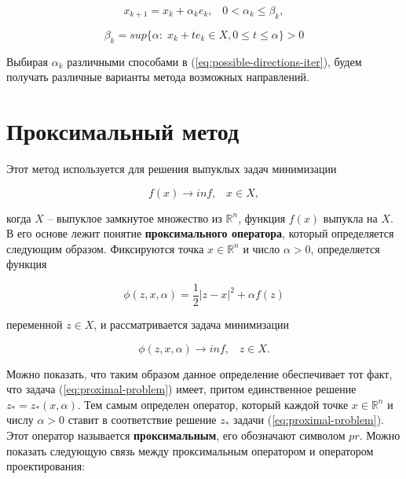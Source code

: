 \documentclass[a4paper, 12pt, titlepage]{article}
\theoremstyle{definition}
\theoremstyle{plain}
\theoremstyle{plain}
\begin{document}
\begin{equation}
 \label{eq:possible-directions-iter}
 x_{k + 1} = x_{k} + \alpha_{k} e_{k}, \;\;\; 0 < \alpha_{k} \leq \beta_{k},
\end{equation}

\begin{equation}
 \beta_{k} = sup \{\alpha: \; x_{k} + t e _{k} \in X, 0 \leq t \leq \alpha\} > 0
\end{equation}

Выбирая $\alpha_{k}$ различными способами в (\ref{eq:possible-directions-iter}),
будем получать различные варианты метода возможных направлений.

\section{Проксимальный метод}

Этот метод используется для решения выпуклых задач минимизации

\begin{equation}
 f(x) \to inf, \;\;\; x \in X,
\end{equation}

когда $X$ -- выпуклое замкнутое множество из $\mathbb{R}^{n}$, функция $f(x)$
выпукла на $X$. В его основе лежит понятие \textbf{проксимального оператора},
который определяется следующим образом. Фиксируются точка $x \in \mathbb{R}^{n}$
и число $\alpha > 0$, определяется функция

\begin{equation}
 \phi(z, x, \alpha) = \frac{1}{2} |z - x|^{2} + \alpha f(z)
\end{equation}

переменной $z \in X$, и рассматривается задача минимизации

\begin{equation}
 \label{eq:proximal-problem}
 \phi(z, x, \alpha) \to inf, \;\;\; z \in X.
\end{equation}

Можно показать, что таким образом данное определение обеспечивает тот факт,
что задача (\ref{eq:proximal-problem}) имеет, притом единственное решение
$z_{*} = z_{*}(x, \alpha)$. Тем самым определен оператор, который каждой точке
$x \in \mathbb{R}^{n}$ и числу $\alpha > 0$ ставит в соответствие решение
$z_{*}$ задачи (\ref{eq:proximal-problem}). Этот оператор называется
\textbf{проксимальным}, его обозначают символом $pr$. Можно показать следующую
связь между проксимальным оператором и оператором проектирования:
\end{document}
